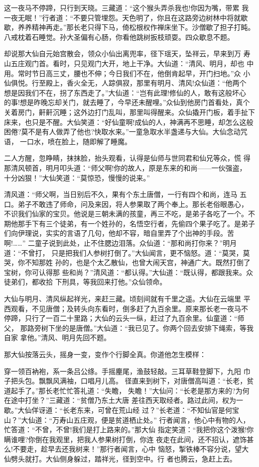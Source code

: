 这一夜马不停蹄，只行到天晓。三藏道：“这个猴头弄杀我也!你因为嘴，带累
我一夜无眠！”行者道：“不要只管埋怨。天色明了，你且在这路旁边树林中将就歇
歇，养养精神再走。”那长老只得下马，倚松根权作禅床坐下。沙僧歇了担子打盹。
八戒枕着石睡觉。孙大圣偏有心肠，你看他跳树扳枝顽耍。四众歇息不题。

却说那大仙自元始宫散会，领众小仙出离兜率，径下瑶天，坠祥云，早来到万
寿山五庄观门首。看时，只见观门大开，地上干净。大仙道：“清风、明月，却也
中用。常时节日高三丈，腰也不伸；今日我们不在，他倒肯起早，开门扫地。”众
小仙俱悦。行至殿上，香火全无，人踪俱寂，那里有明月、清风!众仙道：“他两个
想是因我们不在，拐了东西走了。”大仙道：“岂有此理!修仙的人，敢有这般坏心
的事!想是昨晚忘却关门，就去睡了，今早还未醒哩。”众仙到他房门首看处，真个
关着房门，鼾鼾沉睡；这外边打门乱叫，那里叫得醒来。众仙撬开门板，着手扯下
床来，也只是不醒。大仙笑道：“好仙童啊!成仙的人，神满再不思睡，却怎么这般
困倦?莫不是有人做弄了他也?快取水来。”一童急取水半盏递与大仙。大仙念动咒
语，一口水，喷在脸上，随即解了睡魔。

二人方醒，忽睁睛，抹抹脸，抬头观看，认得是仙师与世同君和仙兄等众，慌
得那清风顿首，明月叩头道：“师父啊!你的故人，原是东来的和尚——一伙强盗，
十分凶狠！”大仙笑道：“莫惊恐，慢慢的说来。”

清风道：“师父啊，当日别后不久，果有个东土唐僧，一行有四个和尚，连马
五口。弟子不敢违了师命，问及来因，将人参果取了两个奉上。那长老俗眼愚心，
不识我们仙家的宝贝。他说是三朝未满的孩童，再三不吃，是弟子各吃了一个。不
期他那手下有三个徒弟，有一个姓孙的，名悟空行者，先偷四个果子吃了。是弟子
们向伊理说，实实的言语了几句，他却不容，暗自里弄了个出神的手段。苦啊!……”
二童子说到此处，止不住腮边泪落。众仙道：“那和尚打你来？”明月道：“不曾打，
只是把我们人参树打倒了。”大仙闻言，更不恼怒。道：“莫哭，莫哭，你不知那姓
孙的，也是个太乙散仙，也曾大闹天宫，神通广大。既然打倒了宝树，你可认得那
些和尚？”清风道：“都认得。”大仙道：“既认得，都跟我来。众徒弟们，都收拾
下刑具，等我回来打他。”众仙领命。

大仙与明月、清风纵起祥光，来赶三藏。顷刻间就有千里之遥。大仙在云端里
平西观看，不见唐僧；及转头向东看时，倒多赶了九百余里。原来那长老一夜马不
停蹄，只行了一百二十里路；大仙的云头一纵，赶过了九百余里。仙童道：“师父，
那路旁树下坐的是唐僧。”大仙道：“我已见了。你两个回去安排下绳索，等我自家
拿他。”清风、明月先回不题。

那大仙按落云头，摇身一变，变作个行脚全真。你道他怎生模样：

穿一领百衲袍，系一条吕公绦。手摇麈尾，渔鼓轻敲。三耳草鞋登脚下，九阳
巾子把头包。飘飘风满袖，口唱月儿高。
径直来到树下，对唐僧高叫道：“长老，贫道起手了。”那长老忙忙答礼道：“失瞻，
失瞻！”大仙问：“长老是那方来的?为何在途中打坐？”三藏道：“贫僧乃东土大唐
差往西天取经者。路过此间，权为一歇。”大仙佯讶道：“长老东来，可曾在荒山经
过？”长老道：“不知仙官是何宝山？”大仙道：“万寿山五庄观，便是贫道栖止处。”
行者闻言，他心中有物的人，忙答道：“不曾，不曾!我们是打上路来的。”那大仙
指定笑道：“我把你这个泼猴!你瞒谁哩?你倒在我观里，把我人参果树打倒，你连
夜走在此间，还不招认，遮饰甚么!不要走，趁早去还我树来！”那行者闻言，心中
恼怒，掣铁棒不容分说，望大仙劈头就打。大仙侧身躲过，踏祥光，径到空中。行
者也腾云，急赶上去。

